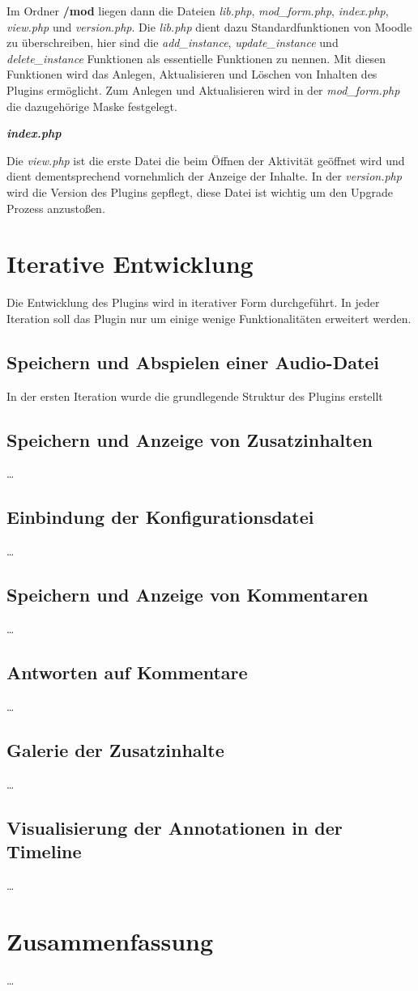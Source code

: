 Im Ordner \textbf{/mod} liegen dann die Dateien \textit{lib.php}, \textit{mod\_form.php}, \textit{index.php}, \textit{view.php} und \textit{version.php}. Die \textit{lib.php} dient dazu Standardfunktionen von Moodle zu überschreiben, hier sind die \textit{add\_instance}, \textit{update\_instance} und \textit{delete\_instance} Funktionen als essentielle Funktionen zu nennen. Mit diesen Funktionen wird das Anlegen, Aktualisieren und Löschen von Inhalten des Plugins ermöglicht. Zum Anlegen und Aktualisieren wird in der \textit{mod\_form.php} die dazugehörige Maske festgelegt.



\textbf{\textit{index.php}}

Die \textit{view.php} ist die erste Datei die beim Öffnen der Aktivität geöffnet wird und dient dementsprechend vornehmlich der Anzeige der Inhalte. In der \textit{version.php} wird die Version des Plugins gepflegt, diese Datei ist wichtig um den Upgrade Prozess anzustoßen.



\section{Iterative Entwicklung}
Die Entwicklung des Plugins wird in iterativer Form durchgeführt. In jeder Iteration soll das Plugin nur um einige wenige Funktionalitäten erweitert werden.  

\subsection{Speichern und Abspielen einer Audio-Datei}
In der ersten Iteration wurde die grundlegende Struktur des Plugins erstellt
\subsection{Speichern und Anzeige von Zusatzinhalten}
\dots

\subsection{Einbindung der Konfigurationsdatei}
\dots

\subsection{Speichern und Anzeige von Kommentaren}
\dots

\subsection{Antworten auf Kommentare}
\dots

\subsection{Galerie der Zusatzinhalte}
\dots

\subsection{Visualisierung der Annotationen in der Timeline}
\dots

\section{Zusammenfassung}
\dots